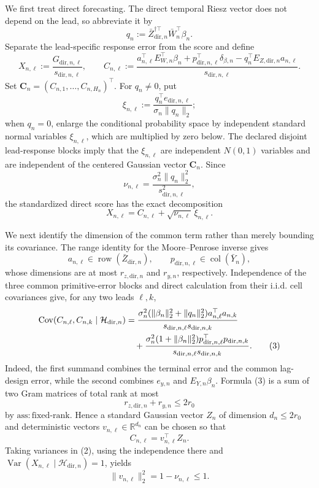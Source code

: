 We first treat direct forecasting.  The direct temporal Riesz vector does not depend on the lead, so abbreviate it by
\[
 q_n:=\bar Z_{\mathrm{dir},n}^{\dagger\top}\bar W_n^{\top}\beta_n.
\]
Separate the lead-specific response error from the score and define
\[
 X_{n,\ell}:=\frac{G_{\mathrm{dir},n,\ell}}{s_{\mathrm{dir},n,\ell}},
 \qquad
 C_{n,\ell}:=\frac{
 a_{n,\ell}^{\top}E_{W,n}^{\top}\beta_n
 +p_{\mathrm{dir},n,\ell}^{\top}\delta_{\beta,n}
 -q_n^{\top}E_{Z,\mathrm{dir},n}a_{n,\ell}}
 {s_{\mathrm{dir},n,\ell}}.
\]
Set \(\boldsymbol C_n=(C_{n,1},\ldots,C_{n,H_n})^\top\).
For \(q_n\ne0\), put
\[
 \xi_{n,\ell}:=\frac{q_n^{\top}e_{\mathrm{dir},n,\ell}}
 {\sigma_n\|q_n\|_2};
\]
when \(q_n=0\), enlarge the conditional probability space by independent standard normal variables \(\xi_{n,\ell}\), which are multiplied by zero below.  The declared disjoint lead-response blocks imply that the \(\xi_{n,\ell}\) are independent \(N(0,1)\) variables and are independent of the centered Gaussian vector \(\boldsymbol C_n\).  Since
\[
 \nu_{n,\ell}
 =\frac{\sigma_n^2\|q_n\|_2^2}{s_{\mathrm{dir},n,\ell}^2},
\]
the standardized direct score has the exact decomposition
\[
 X_{n,\ell}=C_{n,\ell}+\sqrt{\nu_{n,\ell}}\,\xi_{n,\ell}.
 \tag{2}
\]

We next identify the dimension of the common term rather than merely bounding its covariance.  The range identity for the Moore--Penrose inverse gives
\[
 a_{n,\ell}\in\operatorname{row}(\bar Z_{\mathrm{dir},n}),
 \qquad
 p_{\mathrm{dir},n,\ell}\in
 \operatorname{col}(\bar Y_n),
\]
whose dimensions are at most \(r_{z,\mathrm{dir},n}\) and \(r_{y,n}\), respectively.  Independence of the three common primitive-error blocks and direct calculation from their i.i.d. cell covariances give, for any two leads \(\ell,k\),
\[
\begin{aligned}
 \operatorname{Cov}(C_{n,\ell},C_{n,k}\mid\mathcal H_{\mathrm{dir},n})
 &={\sigma_n^2(\|\beta_n\|_2^2+\|q_n\|_2^2)
       a_{n,\ell}^{\top}a_{n,k}
    \over s_{\mathrm{dir},n,\ell}s_{\mathrm{dir},n,k}}\\
 &\quad+{\sigma_n^2(1+\|\beta_n\|_2^2)
       p_{\mathrm{dir},n,\ell}^{\top}p_{\mathrm{dir},n,k}
    \over s_{\mathrm{dir},n,\ell}s_{\mathrm{dir},n,k}}.
 \tag{3}
\end{aligned}
\]
Indeed, the first summand combines the terminal error and the common lag-design error, while the second combines \(e_{y,n}\) and \(E_{Y,n}\beta_n\).  Formula (3) is a sum of two Gram matrices of total rank at most
\[
 r_{z,\mathrm{dir},n}+r_{y,n}\le2r_0
 \tag{4}
\]
by \(\mathrm{ass{:}fixed\mbox{-}rank}\).  Hence a standard Gaussian vector \(Z_n\) of dimension \(d_n\le2r_0\) and deterministic vectors \(v_{n,\ell}\in\mathbb R^{d_n}\) can be chosen so that
\[
 C_{n,\ell}=v_{n,\ell}^{\top}Z_n.
\]
Taking variances in (2), using the independence there and \(\operatorname{Var}(X_{n,\ell}\mid\mathcal H_{\mathrm{dir},n})=1\), yields
\[
 \|v_{n,\ell}\|_2^2=1-\nu_{n,\ell}\le1.
 \tag{5}
\]

